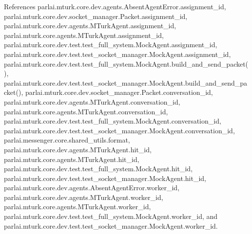 References parlai.\+mturk.\+core.\+dev.\+agents.\+Absent\+Agent\+Error.\+assignment\+\_\+id, parlai.\+mturk.\+core.\+dev.\+socket\+\_\+manager.\+Packet.\+assignment\+\_\+id, parlai.\+mturk.\+core.\+dev.\+agents.\+M\+Turk\+Agent.\+assignment\+\_\+id, parlai.\+mturk.\+core.\+agents.\+M\+Turk\+Agent.\+assignment\+\_\+id, parlai.\+mturk.\+core.\+dev.\+test.\+test\+\_\+full\+\_\+system.\+Mock\+Agent.\+assignment\+\_\+id, parlai.\+mturk.\+core.\+dev.\+test.\+test\+\_\+socket\+\_\+manager.\+Mock\+Agent.\+assignment\+\_\+id, parlai.\+mturk.\+core.\+dev.\+test.\+test\+\_\+full\+\_\+system.\+Mock\+Agent.\+build\+\_\+and\+\_\+send\+\_\+packet(), parlai.\+mturk.\+core.\+dev.\+test.\+test\+\_\+socket\+\_\+manager.\+Mock\+Agent.\+build\+\_\+and\+\_\+send\+\_\+packet(), parlai.\+mturk.\+core.\+dev.\+socket\+\_\+manager.\+Packet.\+conversation\+\_\+id, parlai.\+mturk.\+core.\+dev.\+agents.\+M\+Turk\+Agent.\+conversation\+\_\+id, parlai.\+mturk.\+core.\+agents.\+M\+Turk\+Agent.\+conversation\+\_\+id, parlai.\+mturk.\+core.\+dev.\+test.\+test\+\_\+full\+\_\+system.\+Mock\+Agent.\+conversation\+\_\+id, parlai.\+mturk.\+core.\+dev.\+test.\+test\+\_\+socket\+\_\+manager.\+Mock\+Agent.\+conversation\+\_\+id, parlai.\+messenger.\+core.\+shared\+\_\+utils.\+format, parlai.\+mturk.\+core.\+dev.\+agents.\+M\+Turk\+Agent.\+hit\+\_\+id, parlai.\+mturk.\+core.\+agents.\+M\+Turk\+Agent.\+hit\+\_\+id, parlai.\+mturk.\+core.\+dev.\+test.\+test\+\_\+full\+\_\+system.\+Mock\+Agent.\+hit\+\_\+id, parlai.\+mturk.\+core.\+dev.\+test.\+test\+\_\+socket\+\_\+manager.\+Mock\+Agent.\+hit\+\_\+id, parlai.\+mturk.\+core.\+dev.\+agents.\+Absent\+Agent\+Error.\+worker\+\_\+id, parlai.\+mturk.\+core.\+dev.\+agents.\+M\+Turk\+Agent.\+worker\+\_\+id, parlai.\+mturk.\+core.\+agents.\+M\+Turk\+Agent.\+worker\+\_\+id, parlai.\+mturk.\+core.\+dev.\+test.\+test\+\_\+full\+\_\+system.\+Mock\+Agent.\+worker\+\_\+id, and parlai.\+mturk.\+core.\+dev.\+test.\+test\+\_\+socket\+\_\+manager.\+Mock\+Agent.\+worker\+\_\+id.

